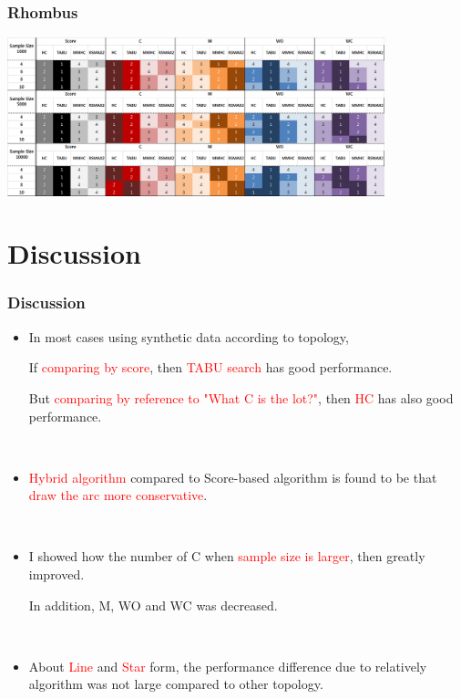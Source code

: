 \documentclass{beamer}
\begin{document}
\begin{frame}
\frametitle{Rhombus}
{\scriptsize{}
	\begin{center}
		\includegraphics[height=130pt]{images/Result_Rhombus}
	\end{center}
}
\end{frame}



\section{Discussion}
\begin{frame}
\frametitle{Discussion}
{\scriptsize{}
	\begin{itemize}
	\item In most cases using synthetic data according to topology,
	
	If \textcolor{red}{comparing by score}, then \textcolor{red}{TABU search} has good performance.
	
	But \textcolor{red}{comparing by reference to "What C is the lot?"}, then \textcolor{red}{HC} has also good performance.
	
	{}\	
	
	\item \textcolor{red}{Hybrid algorithm} compared to Score-based algorithm is found to be that \textcolor{red}{draw the arc more conservative}.

	{}\
	
	\item I showed how the number of C when \textcolor{red}{sample size is larger}, then greatly improved.
	
	In addition, M, WO and WC was decreased.
	
	{}\

	\item About  \textcolor{red}{Line} and  \textcolor{red}{Star} form, the performance difference due to relatively algorithm was not large compared to other topology.
	\end{itemize}
}
\end{frame}
\end{document}
